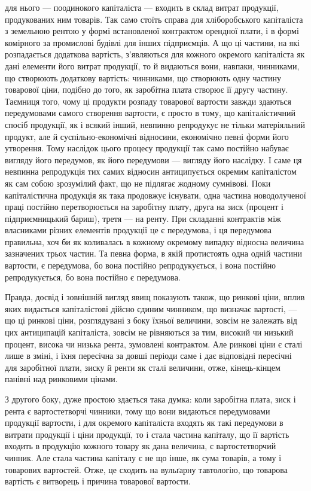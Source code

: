 \parcont{}  %
для нього — поодинокого капіталіста — входить в склад витрат продукції, продукованих
ним товарів. Так само стоїть справа для хліборобського капіталіста з
земельною рентою у формі встановленої контрактом орендної плати, і в формі
комірного за промислові будівлі для інших підприємців. А що ці частини, на які
розпадається додаткова вартість, з’являються для кожного окремого капіталіста
як дані елементи його витрат продукції, то й видаються вони, навпаки, чинниками,
що створюють додаткову вартість: чинниками, що створюють одну
частину товарової ціни, подібно до того, як заробітна плата створює її другу
частину. Таємниця того, чому ці продукти розпаду товарової вартости завжди
здаються передумовами самого створення вартости, є просто в тому, що капіталістичний
спосіб продукції, як і всякий інший, невпинно репродукує не тільки
матеріяльний продукт, але й суспільно-економічні відносини, економічно певні
форми його утворення. Тому наслідок цього процесу продукції так само постійно
набуває вигляду його передумов, як його передумови — вигляду його наслідку.
І саме ця невпинна репродукція тих самих відносин антиципується окремим
капіталістом як сам собою зрозумілий факт, що не підлягає жодному
сумнівові. Поки капіталістична продукція як така продовжує існувати, одна частина
новодолученої праці постійно перетворюється на заробітну плату, друга
на зиск (процент і підприємницький бариш), третя — на ренту. При складанні
контрактів між власниками різних елементів продукції це є передумова, і ця
передумова правильна, хоч би як коливалась в кожному окремому випадку відносна
величина зазначених трьох частин. Та певна форма, в якій протистоять
одна одній частини вартости, є передумова, бо вона постійно репродукується, і
вона постійно репродукується, бо вона постійно є передумова.

Правда, досвід і зовнішній вигляд явищ показують також, що ринкові
ціни, вплив яких видається капіталістові дійсно єдиним чинником, що визначає
вартості, — що ці ринкові ціни, розглядувані з боку їхньої величини, зовсім не
залежать від цих антиципацій капіталіста, зовсім не рівняються за тим, високий
чи низький процент, висока чи низька рента, зумовлені контрактом. Але
ринкові ціни є сталі лише в зміні, і їхня пересічна за довші періоди саме і дає
відповідні пересічні для заробітної плати, зиску й ренти як сталі величини,
отже, кінець-кінцем панівні над ринковими цінами.

З другого боку, дуже простою здається така думка: коли заробітна плата,
зиск і рента є вартостетворчі чинники, тому що вони видаються передумовами
продукції вартости, і для окремого капіталіста входять як такі передумови в
витрати продукції і ціни продукції, то і стала частина капіталу, що її вартість
входить в продукцію кожного товару як дана величина, є вартостетворчий чинник.
Але стала частина капіталу є не що інше, як сума товарів, а тому і товарових
вартостей. Отже, це сходить на вульґарну тавтологію, що товарова вартість
є витворець і причина товарової вартости.

